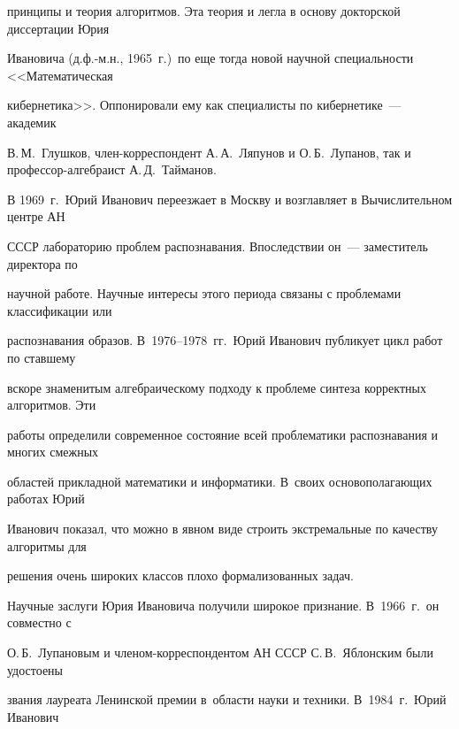 принципы и теория алгоритмов. Эта теория и легла в основу докторской диссертации Юрия 


Ивановича (д.ф.-м.н., 1965~г.)\ по еще тогда новой научной специальности <<Математическая 


кибернетика>>. Оппонировали ему как специалисты по кибернетике~--- академик 


В.\,М.~Глушков, член-корреспондент А.\,А.~Ляпунов и О.\,Б.~Лупанов, так и про\-фес\-сор-ал\-геб\-раист А.\,Д.~Тайманов. 





В 1969~г.\ Юрий Иванович переезжает в Москву и возглавляет в Вычислительном центре АН 


СССР лабораторию проблем распознавания. Впоследствии он~--- заместитель директора по 


научной работе. Научные интересы этого периода связаны с проблемами классификации или 


распознавания образов. В~1976--1978~гг.\ Юрий Иванович публикует цикл работ по ставшему 


вскоре знаменитым алгебраическому подходу к проблеме синтеза корректных алгоритмов. Эти 


работы определили современное состояние всей проблематики распознавания и многих смежных 


областей прикладной математики и информатики. В~своих основополагающих работах Юрий 


Иванович показал, что можно в явном виде строить экстремальные по качеству алгоритмы для 


решения очень широких классов плохо формализованных задач. 


{





}

















Научные заслуги Юрия Ивановича получили широкое признание. В~1966~г.\ он совместно с 


О.\,Б.~Лупановым и чле\-ном-кор\-рес\-пон\-ден\-том АН СССР С.\,В.~Яблонским были удостоены 


звания лауреата Ленинской премии в~об\-ласти науки и техники. В~1984~г.\ Юрий Иванович 


